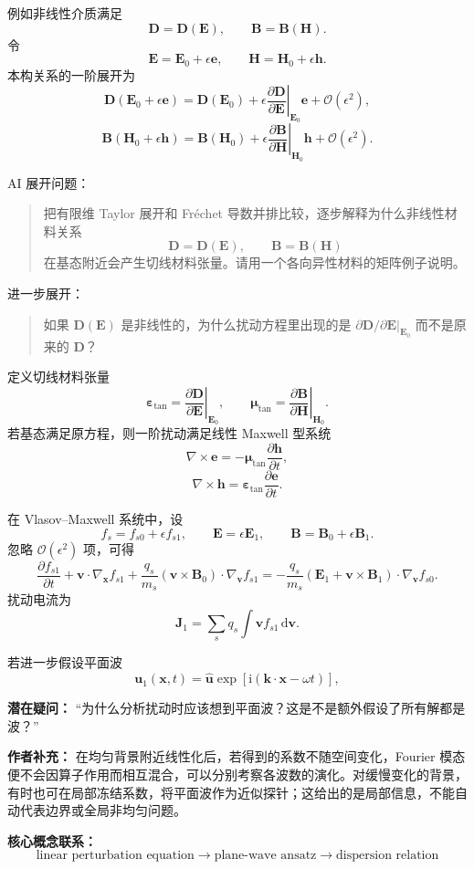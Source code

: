\documentclass[11pt,openany]{ctexbook}
\newcommand{\dd}{\,\mathrm d}
\newcommand{\ii}{\mathrm i}
\newcommand{\Order}{\mathcal O}
\begin{document}
例如非线性介质满足
\[
\bm D=\bm D(\bm E),
\qquad
\bm B=\bm B(\bm H).
\]
令
\[
\bm E=\bm E_0+\epsilon\bm e,
\qquad
\bm H=\bm H_0+\epsilon\bm h.
\]
本构关系的一阶展开为
\[
\bm D(\bm E_0+\epsilon\bm e)
=
\bm D(\bm E_0)
+
\epsilon
\left.
\frac{\partial\bm D}{\partial\bm E}
\right|_{\bm E_0}\bm e
+\Order(\epsilon^2),
\]
\[
\bm B(\bm H_0+\epsilon\bm h)
=
\bm B(\bm H_0)
+
\epsilon
\left.
\frac{\partial\bm B}{\partial\bm H}
\right|_{\bm H_0}\bm h
+\Order(\epsilon^2).
\]

\begin{askai}
AI 展开问题：
\begin{quote}
把有限维 Taylor 展开和 Fr\'echet 导数并排比较，逐步解释为什么非线性材料关系
\[
\bm D=\bm D(\bm E),\qquad \bm B=\bm B(\bm H)
\]
在基态附近会产生切线材料张量。请用一个各向异性材料的矩阵例子说明。
\end{quote}

进一步展开：
\begin{quote}
如果 \(\bm D(\bm E)\) 是非线性的，为什么扰动方程里出现的是 \(\partial\bm D/\partial\bm E|_{\bm E_0}\) 而不是原来的 \(\bm D\)？
\end{quote}
\end{askai}

定义切线材料张量
\[
\bm\varepsilon_{\mathrm{tan}}
=
\left.\frac{\partial\bm D}{\partial\bm E}\right|_{\bm E_0},
\qquad
\bm\mu_{\mathrm{tan}}
=
\left.\frac{\partial\bm B}{\partial\bm H}\right|_{\bm H_0}.
\]
若基态满足原方程，则一阶扰动满足线性 Maxwell 型系统
\[
\nabla\times\bm e
=
-\bm\mu_{\mathrm{tan}}\frac{\partial\bm h}{\partial t},
\]
\[
\nabla\times\bm h
=
\bm\varepsilon_{\mathrm{tan}}\frac{\partial\bm e}{\partial t}.
\]

在 Vlasov--Maxwell 系统中，设
\[
f_s=f_{s0}+\epsilon f_{s1},
\qquad
\bm E=\epsilon\bm E_1,
\qquad
\bm B=\bm B_0+\epsilon\bm B_1.
\]
忽略 \(\Order(\epsilon^2)\) 项，可得
\[
\frac{\partial f_{s1}}{\partial t}
+\bm v\cdot\nabla_{\bm x}f_{s1}
+\frac{q_s}{m_s}
(\bm v\times\bm B_0)\cdot\nabla_{\bm v}f_{s1}
=
-\frac{q_s}{m_s}
(\bm E_1+\bm v\times\bm B_1)
\cdot\nabla_{\bm v}f_{s0}.
\]
扰动电流为
\[
\bm J_1=\sum_s q_s\int \bm v f_{s1}\dd\bm v.
\]

若进一步假设平面波
\[
\bm u_1(\bm x,t)
=
\widehat{\bm u}
\exp[\ii(\bm k\cdot\bm x-\omega t)],
\]

\begin{authornote}
\textbf{潜在疑问：}
“为什么分析扰动时应该想到平面波？这是不是额外假设了所有解都是波？”

\textbf{作者补充：}
在均匀背景附近线性化后，若得到的系数不随空间变化，Fourier 模态便不会因算子作用而相互混合，可以分别考察各波数的演化。对缓慢变化的背景，有时也可在局部冻结系数，将平面波作为近似探针；这给出的是局部信息，不能自动代表边界或全局非均匀问题。

\textbf{核心概念联系：}
\[
\text{linear perturbation equation}
\longrightarrow
\text{plane-wave ansatz}
\longrightarrow
\text{dispersion relation}
\]
\end{authornote}
\end{document}
